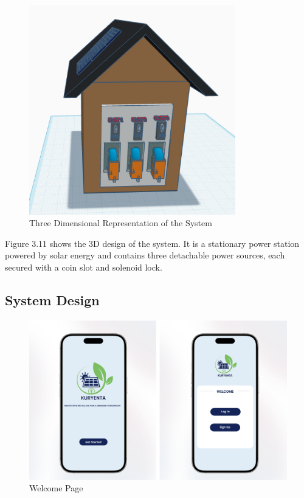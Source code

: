 {    \begin{figure}[H]
  	\centering
  	\caption{Three Dimensional Representation of the System}
  	\label{fig:3d}
  	\includegraphics[width=0.8\textwidth]{figures/3D.png}
  \end{figure}
  
Figure 3.11 shows the 3D design of the system. It is a stationary power station powered by solar energy and contains three detachable power sources, each secured with a coin slot and solenoid lock.
  
  \subsection{System Design}
  
     \begin{figure}[H]
  	\centering
  	\caption{Welcome Page}
  	\label{fig:welcome}
  	\includegraphics[width=1\textwidth]{figures/welcome.png}
  \end{figure}
  
}
